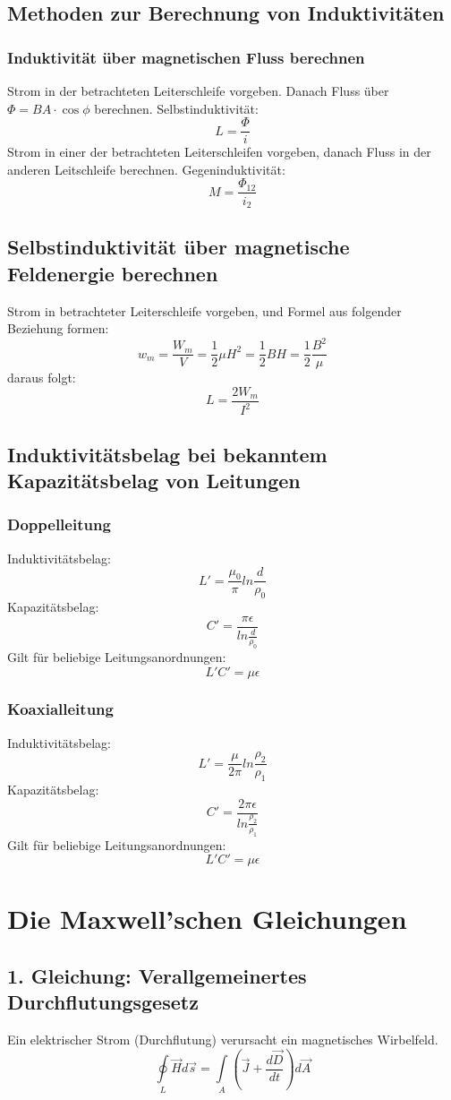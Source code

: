 \documentclass[12pt,a4paper]{article}
\begin{document}
\subsection{Methoden zur Berechnung von Induktivitäten}
\subsubsection{Induktivität über magnetischen Fluss berechnen}
Strom in der betrachteten Leiterschleife vorgeben. Danach Fluss über $\Phi = BA\cdot \cos \phi$ berechnen.
Selbstinduktivität:
\[L = \frac{\Phi}{i}\]
Strom in einer der betrachteten Leiterschleifen vorgeben, danach Fluss in der anderen Leitschleife berechnen.
Gegeninduktivität:
\[M = \frac{\Phi_{12}}{i_2}\]

\subsection{Selbstinduktivität über magnetische Feldenergie berechnen}
Strom in betrachteter Leiterschleife vorgeben, und Formel aus folgender Beziehung formen:
\[w_m = \frac{W_m}{V} = \frac{1}{2}\mu H^2 = \frac{1}{2}BH = \frac{1}{2} \frac{B^2}{\mu}\]
daraus folgt:
\[L = \frac{2W_m}{I^2}\]

\subsection{Induktivitätsbelag bei bekanntem Kapazitätsbelag von Leitungen}
\subsubsection{Doppelleitung}
Induktivitätsbelag:
\[L' = \frac{\mu_0}{\pi} ln\frac{d}{\rho_0}\]
Kapazitätsbelag:
\[C' = \frac{\pi \epsilon}{ln \frac{d}{\rho_0}}\]
Gilt für beliebige Leitungsanordnungen:
\[L'C' = \mu \epsilon\]

\subsubsection{Koaxialleitung}
Induktivitätsbelag:
\[L' =  \frac{\mu}{2\pi} ln\frac{\rho_2}{\rho_1}\]
Kapazitätsbelag:
\[C' = \frac{2\pi \epsilon}{ln \frac{\rho_2}{\rho_1}}\]
Gilt für beliebige Leitungsanordnungen:
\[L'C' = \mu \epsilon\]

\section{Die Maxwell'schen Gleichungen}
\subsection{1. Gleichung: Verallgemeinertes Durchflutungsgesetz}
Ein elektrischer Strom (Durchflutung) verursacht ein magnetisches Wirbelfeld.
\[\oint\limits_L{\vec{H}d\vec{s}} = \int\limits_A{(\vec{J} + \frac{d\vec{D}}{dt})d\vec{A}}\]
\end{document}
